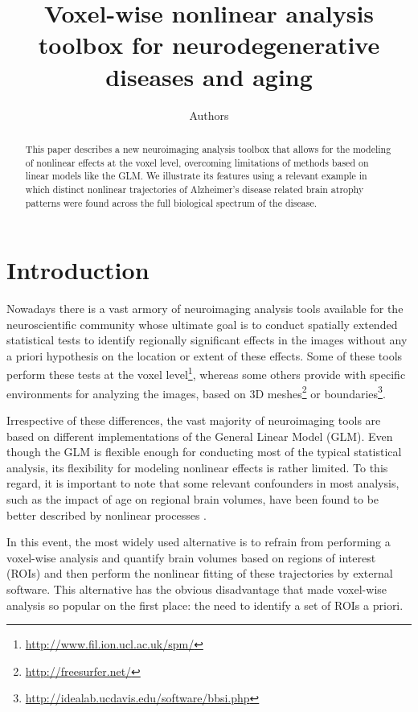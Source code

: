\documentclass{article}
\title{Voxel-wise nonlinear analysis toolbox for neurodegenerative diseases and aging}
\author{
  Authors\\
}
\begin{document}

\maketitle

\begin{abstract}
This paper describes a new neuroimaging analysis toolbox that allows for the modeling of nonlinear effects at the voxel level, overcoming limitations of methods based on linear models like the GLM. We illustrate its features using a relevant example in which distinct nonlinear trajectories of Alzheimer's disease related brain atrophy patterns were found across the full biological spectrum of the disease.
\end{abstract}

\section{Introduction}

Nowadays there is a vast armory of neuroimaging analysis tools available for the neuroscientific community whose ultimate goal is to conduct spatially extended statistical tests to identify regionally significant effects in the images without any a priori hypothesis on the location or extent of these effects. Some of these tools perform these tests at the voxel level\footnote{\url{http://www.fil.ion.ucl.ac.uk/spm/}}, whereas some others provide with specific environments for analyzing the images, based on 3D meshes\footnote{\url{http://freesurfer.net/}} or boundaries\footnote{\url{http://idealab.ucdavis.edu/software/bbsi.php}}. 

Irrespective of these differences, the vast majority of neuroimaging tools are based on different implementations of the General Linear Model (GLM). Even though the GLM is flexible enough for conducting most of the typical statistical analysis, its flexibility for modeling nonlinear effects is rather limited. To this regard, it is important to note that some relevant confounders in most analysis, such as the impact of age on regional brain volumes, have been found to be better described by nonlinear processes \cite{nonlinear_subcortical,nonlinear_cortical}.

In this event, the most widely used alternative is to refrain from performing a voxel-wise analysis and quantify brain volumes based on regions of interest (ROIs) and then perform the nonlinear fitting of these trajectories by external software. This alternative has the obvious disadvantage that made voxel-wise analysis so popular on the first place: the need to identify a set of ROIs a priori. 
\end{document}
